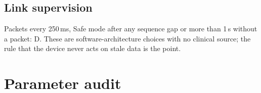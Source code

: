 \documentclass[10pt,a4paper]{article}
\newcommand{\lvl}[1]{\textsf{\small #1}}
\begin{document}
\subsection{Link supervision}
Packets every 250\,ms, Safe mode after any sequence gap or more than 1\,s without a packet: \lvl{D}. These are
software-architecture choices with no clinical source; the rule that the device never acts on stale data is the point.

\section{Parameter audit}\label{sec:audit}

\begingroup\small
\setlength{\LTcapwidth}{\textwidth}
\end{document}

